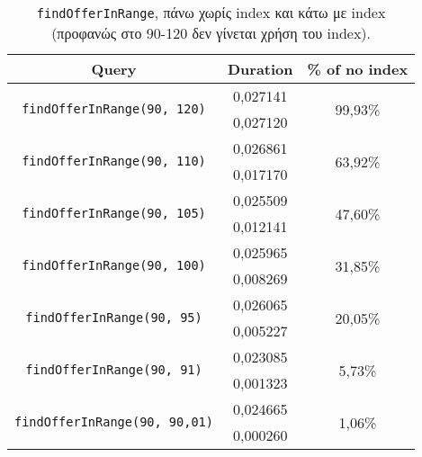 \begin{table}
\centering
    \begin{tabular}{|c|c|c|}
        \hline
        \textbf{Query} & \textbf{Duration} & \textbf{\% of no index} \\ 
        \hline
        
        \multirow{2}{*}{\texttt{findOfferInRange(90, 120)}} 
        & 0,027141 & \multirow{2}{*}{99,93\%}\\ 
        \cline{2-2}
        & 0,027120 & \\
        \hline

        \multirow{2}{*}{\texttt{findOfferInRange(90, 110)}} 
        & 0,026861 & \multirow{2}{*}{63,92\%}\\ 
        \cline{2-2}
        & 0,017170 & \\
        \hline
 
        \multirow{2}{*}{\texttt{findOfferInRange(90, 105)}} 
        & 0,025509 & \multirow{2}{*}{47,60\%}\\ 
        \cline{2-2}
        & 0,012141 & \\
        \hline

        \multirow{2}{*}{\texttt{findOfferInRange(90, 100)}} 
        & 0,025965 & \multirow{2}{*}{31,85\%}\\ 
        \cline{2-2}
        & 0,008269 & \\
        \hline

        \multirow{2}{*}{\texttt{findOfferInRange(90, 95)}} 
        & 0,026065 & \multirow{2}{*}{20,05\%}\\ 
        \cline{2-2}
        & 0,005227 & \\
        \hline

        \multirow{2}{*}{\texttt{findOfferInRange(90, 91)}} 
        & 0,023085 & \multirow{2}{*}{5,73\%}\\ 
        \cline{2-2}
        & 0,001323 & \\
        \hline

        \multirow{2}{*}{\texttt{findOfferInRange(90, 90,01)}} 
        & 0,024665 & \multirow{2}{*}{1,06\%}\\ 
        \cline{2-2}
        & 0,000260 & \\
        \hline
    \end{tabular}
    
\captionsetup{justification=centering}
\caption{\texttt{findOfferInRange}, πάνω χωρίς index και κάτω με index 
\\(προφανώς στο 90-120 δεν γίνεται χρήση του index).}
\end{table}
